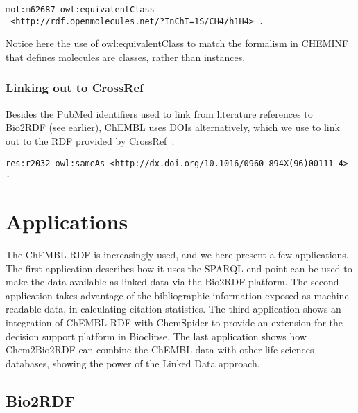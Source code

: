 \documentclass[sw]{iosart2c}
\begin{document}
\begin{tiny}
\begin{verbatim}
mol:m62687 owl:equivalentClass
 <http://rdf.openmolecules.net/?InChI=1S/CH4/h1H4> .
\end{verbatim}
\end{tiny}

Notice here the use of owl:equivalentClass to match the formalism in CHEMINF that defines molecules
are classes, rather than instances.

\subsubsection{Linking out to CrossRef}

Besides the PubMed identifiers used to link from literature references to Bio2RDF (see earlier),
ChEMBL uses DOIs alternatively, which we use to link out to the RDF provided by CrossRef~\citep{CrossRefRDF}:

\begin{tiny}
\begin{verbatim}
res:r2032 owl:sameAs <http://dx.doi.org/10.1016/0960-894X(96)00111-4> .
\end{verbatim}
\end{tiny}

\section{Applications}

The ChEMBL-RDF is increasingly used, and we here present a few applications. The first application
describes how it uses the SPARQL end point can be used to make the data available as linked data
via the Bio2RDF platform. The second application takes advantage of the bibliographic information
exposed as machine readable data, in calculating citation statistics. The third application shows
an integration of ChEMBL-RDF with ChemSpider to provide an extension for the decision support
platform in Bioclipse. The last application shows how Chem2Bio2RDF can combine the ChEMBL data
with other life sciences databases, showing the power of the Linked Data approach.

\subsection{Bio2RDF}
\end{document}
